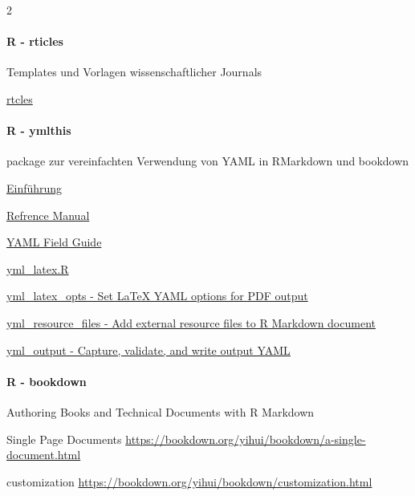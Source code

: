 \documentclass[
  twoside]{article}
\let\oldparagraph\paragraph
\renewcommand{\paragraph}[1]{\oldparagraph{#1}\mbox{}}
\begin{document}
\begin {multicols}{2}

\hypertarget{r---rticles}{%
\paragraph{R - rticles}\label{r---rticles}}

Templates und Vorlagen wissenschaftlicher Journals

\href{https://github.com/rstudio/rticles}{rtcles}

\hypertarget{r---ymlthis}{%
\paragraph{R - ymlthis}\label{r---ymlthis}}

package zur vereinfachten Verwendung von YAML in RMarkdown und bookdown

\href{https://cran.r-project.org/web/packages/ymlthis/vignettes/introduction-to-ymlthis.html}{Einführung}

\href{https://cran.r-project.org/web/packages/ymlthis/ymlthis.pdf}{Refrence
Manual}

\href{https://cran.r-project.org/web/packages/ymlthis/vignettes/yaml-fieldguide.html}{YAML
Field Guide}

\href{https://github.com/r-lib/ymlthis/blob/master/R/yml_latex.R}{yml\_latex.R}

\href{https://rdrr.io/github/r-lib/ymlthis/man/yml_latex_opts.html}{yml\_latex\_opts
- Set LaTeX YAML options for PDF output}

\href{https://www.rdocumentation.org/packages/ymlthis/versions/0.1.2/topics/yml_resource_files}{yml\_resource\_files
- Add external resource files to R Markdown document}

\href{https://github.com/r-lib/ymlthis/blob/master/R/yml_output.R}{yml\_output
- Capture, validate, and write output YAML}

\hypertarget{r---bookdown}{%
\paragraph{R - bookdown}\label{r---bookdown}}

Authoring Books and Technical Documents with R Markdown

Single Page Documents
\url{https://bookdown.org/yihui/bookdown/a-single-document.html}

customization
\url{https://bookdown.org/yihui/bookdown/customization.html}
\columnbreak


\end{multicols}
\end{document}
